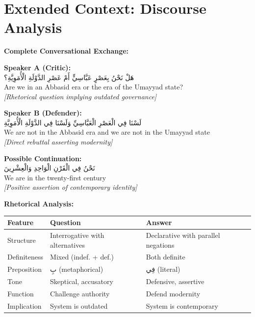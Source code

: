 \documentclass[letterpaper,12pt]{article}
\begin{document}
\section{Extended Context: Discourse Analysis}

\begin{tcolorbox}[colback=boxcolor,colframe=accentcolor,title=\textbf{Question-Answer Dialogue},breakable]

\textbf{Complete Conversational Exchange:}

\textbf{Speaker A (Critic):}\\
\textarabic{هَلْ نَحْنُ بِعَصْرٍ عَبَّاسِيٍّ أَمْ عَصْرِ الدَّوْلَةِ الْأُمَوِيَّةِ؟}\\
Are we in an Abbasid era or the era of the Umayyad state?\\
\textit{[Rhetorical question implying outdated governance]}

\textbf{Speaker B (Defender):}\\
\textarabic{لَسْنَا فِي الْعَصْرِ الْعَبَّاسِيِّ وَلَسْنَا فِي الدَّوْلَةِ الْأُمَوِيَّةِ}\\
We are not in the Abbasid era and we are not in the Umayyad state\\
\textit{[Direct rebuttal asserting modernity]}

\textbf{Possible Continuation:}\\
\textarabic{نَحْنُ فِي الْقَرْنِ الْوَاحِدِ وَالْعِشْرِينَ}\\
We are in the twenty-first century\\
\textit{[Positive assertion of contemporary identity]}

\vspace{0.5em}
\textbf{Rhetorical Analysis:}

\begin{tabular}{|l|p{5cm}|p{5cm}|}
\hline
\textbf{Feature} & \textbf{Question} & \textbf{Answer} \\
\hline
Structure & Interrogative with alternatives & Declarative with parallel negations \\
\hline
Definiteness & Mixed (indef. + def.) & Both definite \\
\hline
Preposition & \textarabic{بِ} (metaphorical) & \textarabic{فِي} (literal) \\
\hline
Tone & Skeptical, accusatory & Defensive, assertive \\
\hline
Function & Challenge authority & Defend modernity \\
\hline
Implication & System is outdated & System is contemporary \\
\hline
\end{tabular}


\end{tcolorbox}
\end{document}
